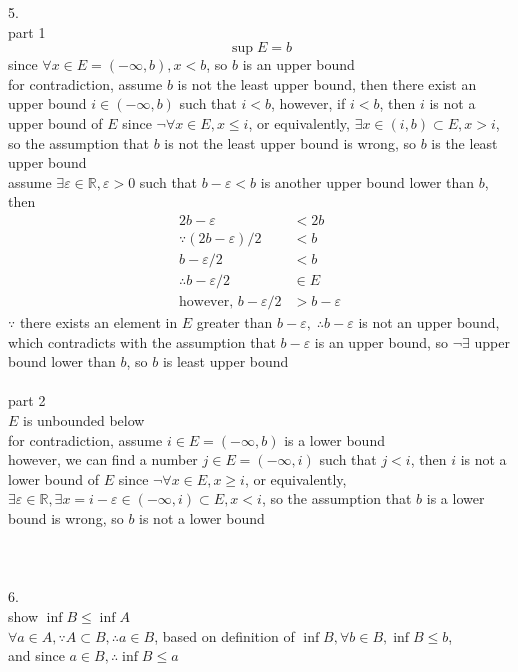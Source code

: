 \documentclass[12pt, border = 4pt, multi]{article} %
\begin{document}
5.\\
part 1
\[\sup E = b\]
since $\forall x \in E = (-\infty, b), x < b$, so $b$ is an upper bound\\
for contradiction, assume $b$ is not the least upper bound, then there exist an upper bound $i \in (-\infty, b)$ such that $i < b$, however, if $i < b$, then $i$ is not a upper bound of $E$ since $\neg\forall x \in E, x \leq i$, or equivalently, $\exists x \in (i, b) \subset E, x > i$, so the assumption that $b$ is not the least upper bound is wrong, so $b$ is the least upper bound\\
assume $\exists \varepsilon \in \mathbb{R}, \varepsilon > 0$ such that $b - \varepsilon < b$ is another upper bound lower than $b$, then
\begin{align*}
2b - \varepsilon &< 2b\\
\because (2b - \varepsilon) / 2 &< b\\
b - \varepsilon / 2 &< b\\ 
\therefore b - \varepsilon / 2 &\in E\\
\text{however, } b - \varepsilon / 2 &> b - \varepsilon
\end{align*}
$\because$ there exists an element in $E$ greater than $b - \varepsilon, \;\therefore b - \varepsilon$ is not an upper bound, which contradicts with the assumption that $b - \varepsilon$ is an upper bound, so $\neg\exists$ upper bound lower than $b$, so $b$ is least upper bound\\
\\
part 2\\
$E$ is unbounded below\\
for contradiction, assume $i \in E = (-\infty, b)$ is a lower bound\\
however, we can find a number $j \in E = (-\infty, i)$ such that $j < i$, then $i$ is not a lower bound of $E$ since $\neg\forall x \in E, x \geq i$, or equivalently, $\exists \varepsilon \in \mathbb{R}, \exists x = i - \varepsilon \in (-\infty, i) \subset E, x < i$, so the assumption that $b$ is a lower bound is wrong, so $b$ is not a lower bound\\
\\
\\
\\
6.\\
show $\inf B \leq \inf A$\\
$\forall a \in A, \because A \subset B, \therefore a \in B$, based on definition of $\inf B, \forall b \in B, \inf B \leq b$,\\
and since $a \in B, \therefore \inf B \leq a$\\
\end{document}
